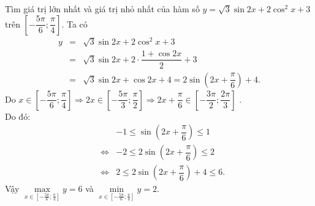 \begin{bt}%
	Tìm giá trị lớn nhất và giá trị nhỏ nhất của hàm số $y=\sqrt{3} \sin 2 x+2 \cos^2 x+3$ trên $\left[-\dfrac{5 \pi}{6}; \dfrac{\pi}{4}\right]$.
	\loigiai
	{Ta có
		\allowdisplaybreaks
		\begin{eqnarray*}
			y
			&=& \sqrt{3} \sin 2 x+2 \cos^2 x+3\\
			&=&\sqrt{3} \sin 2 x+2\cdot\dfrac{1+\cos 2x}{2}+3\\
			&=& \sqrt{3} \sin 2 x+\cos 2x+4=2\sin \left(2x+\dfrac{\pi}{6}\right)+4.
		\end{eqnarray*}
		Do $x\in \left[ -\dfrac{5 \pi}{6}; \dfrac{\pi}{4}\right]\Rightarrow 2x \in \left[-\dfrac{5 \pi}{3}; \dfrac{\pi}{2}\right] \Rightarrow 2x +\dfrac{\pi}{6}\in \left[-\dfrac{3\pi}{2}; \dfrac{2\pi}{3}\right]$ .\\
		Do đó: 
		\allowdisplaybreaks
		\begin{eqnarray*}
			& & -1\leq \sin \left(2x+\dfrac{\pi}{6}\right) \leq 1\\
			&\Leftrightarrow& -2\leq 2\sin \left(2x+\dfrac{\pi}{6}\right) \leq 2\\
			&\Leftrightarrow& 2\leq 2\sin \left(2x+\dfrac{\pi}{6}\right)+4 \leq 6.
		\end{eqnarray*}
		Vậy $\max\limits_{x \in \left[-\tfrac{5 \pi}{6}; \tfrac{\pi}{4}\right]} y=6$ và $\min\limits_{x \in \left[-\tfrac{5 \pi}{6}; \tfrac{\pi}{4}\right]} y=2$.
	}
\end{bt}

